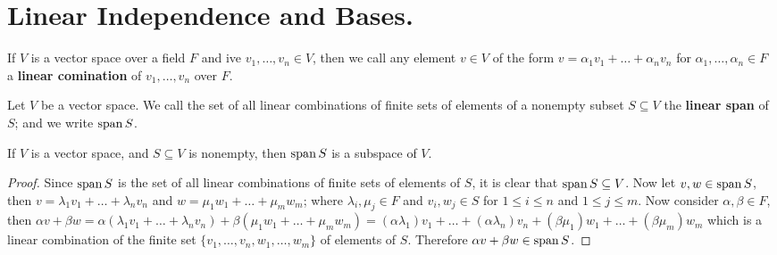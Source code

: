 
\section{Linear Independence and Bases.}
\label{section1}

\begin{definition}
     If $V$ is a vector space over a field  $F$ and ive  $ v_1, \dots,v_n \in
     V$, then we call any element $v \in V$ of the form $v=\alpha_1v_1+\dots+\alpha_n 
     v_n$ for $\alpha_1, \dots, \alpha_n \in F$ a \textbf{linear comination} 
     of $ v_1, \dots, v_n$ over $F$.
 \end{definition}

 \begin{definition}
     Let $V$ be a vector space. We call the set of all linear combinations of
     finite sets of elements of a nonempty subset  $S \subseteq V$ the
     \textbf{linear span} of $S$; and we write $\operatorname{span}{S}$.
 \end{definition}

 \begin{lemma}
     If $V$ is a vector space, and  $S \subseteq V$ is nonempty, then
     $\operatorname{span}{S}$ is a subspace of $V$.
 \end{lemma}
 \begin{proof}
     Since $\operatorname{span}{S}$ is the set of all linear combinations of finite sets of
     elements of $S$, it is clear that  $\operatorname{span}{S} \subseteq V$. Now let $v,w \in
     \operatorname{span}{S}$, then $v=\lambda_1v_1+ \dots+\lambda_nv_n$ and
     $w=\mu_1w_1+\dots+\mu_mw_m$; where $\lambda_i,\mu_j \in F$ and  $v_i,w_j
     \in S$ for  $1 \leq i \leq n$ and  $1 \leq j \leq m$. Now consider
     $\alpha,\beta \in F$, then  $\alpha v+\beta w=\alpha(\lambda_1v_1+
     \dots+\lambda_nv_n)+\beta(\mu_1w_1+\dots+\mu_mw_m)=(\alpha\lambda_1)v_1+\dots+(\alpha\lambda_n)v_n+(\beta\mu_1)w_1+\dots+(\beta\mu_m)w_m$
     which is a linear combination of the finite set $\{v_1, \dots, v_n, w_1,
     \dots, w_m\}$ of elements of $S$. Therefore  $\alpha v+\beta w \in
     \operatorname{span}{S}$.
 \end{proof}


